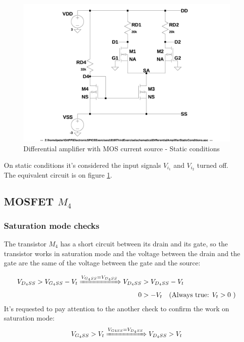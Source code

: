 \begin{figure}[h]
  \centering
  \includegraphics[width=12cm]{schematics/DifferentialAmplifier/StaticConditions.jpg}
  \caption{Differential amplifier with MOS current source - Static conditions}
  \label{DifferentialAmplifierStaticConditions}
\end{figure}

On static conditions it's considered the input signals $V_{i_1}$ and $V_{i_2}$ turned off.\\
The equivalent circuit is on figure \ref{DifferentialAmplifierStaticConditions}.\par

\subsection{MOSFET $M_4$}
\subsubsection{Saturation mode checks}\label{M4SatCheck}
The transistor $M_4$ has a short circuit between its drain and its gate, so the transistor works in saturation mode and the voltage between the drain and the gate are the same of the voltage between the gate and the source:\par
\begin{align}
V_{{D_4}SS} > V_{{G_4}SS} - V_t \xRightarrow{V_{{G_4}SS} = V_{{D_4}SS}}
V_{{D_4}SS} &> V_{{D_4}SS} - V_t\\
0 &> - V_t \quad \text{(Always true: }V_t > 0\text{ )}
\end{align}
It's requested to pay attention to the another check to confirm the work on saturation mode:
\begin{gather}
V_{{G_4}SS} > V_t \xRightarrow{V_{{G4}SS} = V_{{D_4}SS}} V_{{D_4}SS} > V_t \label{CheckSat2eq}
\end{gather}


